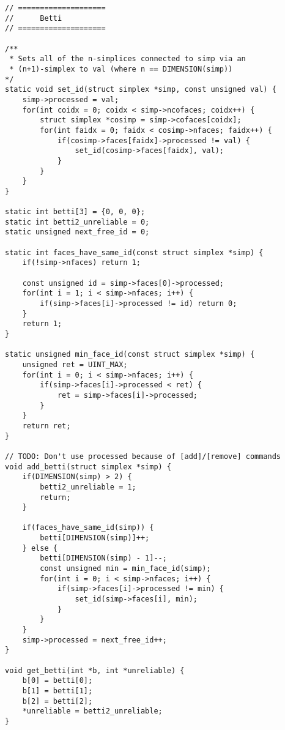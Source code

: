 \documentclass{article}
\begin{document}
\begin{verbatim}
// ====================
//      Betti
// ====================

/**
 * Sets all of the n-simplices connected to simp via an
 * (n+1)-simplex to val (where n == DIMENSION(simp))
*/
static void set_id(struct simplex *simp, const unsigned val) {
    simp->processed = val;
    for(int coidx = 0; coidx < simp->ncofaces; coidx++) {
        struct simplex *cosimp = simp->cofaces[coidx];
        for(int faidx = 0; faidx < cosimp->nfaces; faidx++) {
            if(cosimp->faces[faidx]->processed != val) {
                set_id(cosimp->faces[faidx], val);
            }
        }
    }
}

static int betti[3] = {0, 0, 0};
static int betti2_unreliable = 0;
static unsigned next_free_id = 0;

static int faces_have_same_id(const struct simplex *simp) {
    if(!simp->nfaces) return 1;

    const unsigned id = simp->faces[0]->processed;
    for(int i = 1; i < simp->nfaces; i++) {
        if(simp->faces[i]->processed != id) return 0;
    }
    return 1;
}

static unsigned min_face_id(const struct simplex *simp) {
    unsigned ret = UINT_MAX;
    for(int i = 0; i < simp->nfaces; i++) {
        if(simp->faces[i]->processed < ret) {
            ret = simp->faces[i]->processed;
        }
    }
    return ret;
}

// TODO: Don't use processed because of [add]/[remove] commands
void add_betti(struct simplex *simp) {
    if(DIMENSION(simp) > 2) {
        betti2_unreliable = 1;
        return;
    }

    if(faces_have_same_id(simp)) {
        betti[DIMENSION(simp)]++;
    } else {
        betti[DIMENSION(simp) - 1]--;
        const unsigned min = min_face_id(simp);
        for(int i = 0; i < simp->nfaces; i++) {
            if(simp->faces[i]->processed != min) {
                set_id(simp->faces[i], min);
            }
        }
    }
    simp->processed = next_free_id++;
}

void get_betti(int *b, int *unreliable) {
    b[0] = betti[0];
    b[1] = betti[1];
    b[2] = betti[2];
    *unreliable = betti2_unreliable;
}
\end{verbatim}
\normalsize
\end{document}
